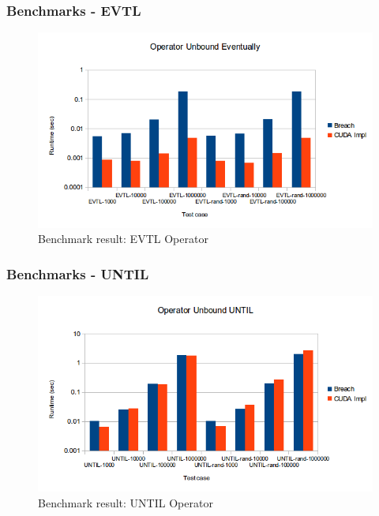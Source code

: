 \documentclass{beamer}
\begin{document}
\begin{frame}
\frametitle{Benchmarks - EVTL}
\begin{figure}[H]
    \includegraphics[scale=0.5]{bm_evtl.png}
    \caption{
        \label{fig:bm_evtl}
        Benchmark result: EVTL Operator}
\end{figure}
\end{frame}

\begin{frame}
\frametitle{Benchmarks - UNTIL}
\begin{figure}[H]
    \includegraphics[scale=0.5]{bm_until.png}
    \caption{
        \label{fig:bm_until}
        Benchmark result: UNTIL Operator}
\end{figure}
\end{frame}
\end{document}
